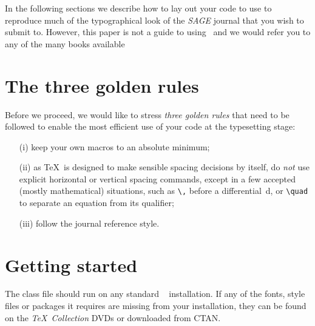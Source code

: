 \documentclass[Afour,sageh,times]{includes/tex/sagej}
\begin{document}
In the following sections we describe how to lay out your code to use
\textsf{\journalclass} to reproduce much of the typographical look of
the \textit{SAGE} journal that you wish to submit to. However, this
paper is not a guide to using \LaTeXe~and we would refer you to any of
the many books available
\citep[see, for example,][]{kopka_daly_2003, lamport_1994, mittlebach_goossens_2004}

\section{The three golden rules}

Before we proceed, we would like to stress \textit{three golden rules}
that need to be followed to enable the most efficient use of your code
at the typesetting stage:

\begin{enumerate}
  \item[(i)] keep your own macros to an absolute minimum;
  \item[(ii)] as \TeX\ is designed to make sensible spacing decisions by 
  itself, do \textit{not} use explicit horizontal or vertical spacing 
  commands, except in a few accepted (mostly mathematical) situations, such as 
  \verb"\," before a differential~d, or \verb"\quad" to separate an equation 
  from its qualifier;
  \item[(iii)] follow the journal reference style.
\end{enumerate}

\section{Getting started}

The \textsf{\journalclassshort} class file should run on any standard
\LaTeXe~ installation. If any of the fonts, style files or packages it
requires are missing from your installation, they can be found on the
\textit{\TeX\ Collection} DVDs or downloaded from CTAN.
\end{document}
